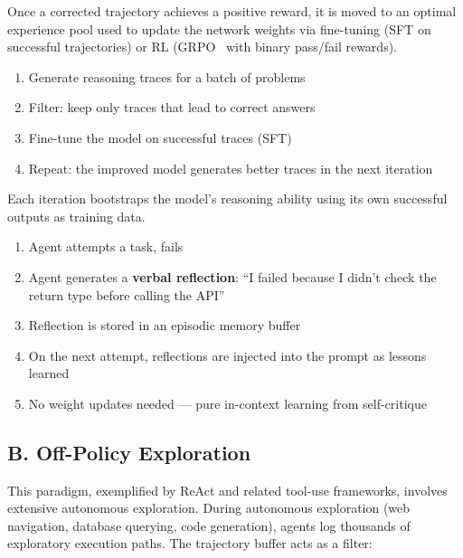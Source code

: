 Once a corrected trajectory achieves a positive reward, it is moved to an optimal experience pool used to update the network weights via fine-tuning (SFT on successful trajectories) or RL (GRPO~\cite{shao2024deepseekmath} with binary pass/fail rewards).

\begin{keybox}
\begin{enumerate}
  \item Generate reasoning traces for a batch of problems
  \item Filter: keep only traces that lead to correct answers
  \item Fine-tune the model on successful traces (SFT)
  \item Repeat: the improved model generates better traces in the next iteration
\end{enumerate}

Each iteration bootstraps the model’s reasoning ability using its own successful outputs as training data.
\end{keybox}

\begin{keybox}
\begin{enumerate}
  \item Agent attempts a task, fails
  \item Agent generates a \textbf{verbal reflection}: ``I failed because I didn’t check the return type before calling the API''
  \item Reflection is stored in an episodic memory buffer
  \item On the next attempt, reflections are injected into the prompt as lessons learned
  \item No weight updates needed --- pure in-context learning from self-critique
\end{enumerate}
\end{keybox}

\subsection{B. Off-Policy Exploration}
\label{b.-off-policy-exploration-react-tool-use-frameworks}

This paradigm, exemplified by ReAct \cite{yao2023react} and related tool-use frameworks, involves extensive autonomous exploration. During autonomous exploration (web navigation, database querying, code generation), agents log thousands of exploratory execution paths. The trajectory buffer acts as a filter:

